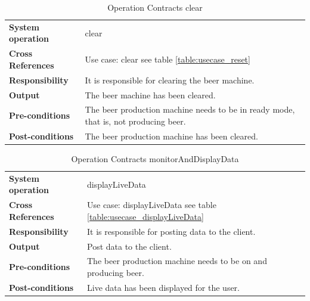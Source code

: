 \begin{table}[H]
    \begin{tabularx}{\textwidth}{|>{\RaggedRight}p{3.7cm}|>{\RaggedRight}X|}
        \hline
        \multicolumn{2}{|c|}{\textbf{clear}}\\
        \hline
        \textbf{System operation} & clear\\
        \hline
        \textbf{Cross References} & Use case: clear see table \ref{table:usecase_reset} \\
        \hline
        \textbf{Responsibility} & It is responsible for clearing the beer 
                machine. \\
        \hline
        \textbf{Output} & The beer machine has been cleared. \\
        \hline
        \textbf{Pre-conditions} & The beer production machine needs to be in
                ready mode, that is, not producing beer. \\
        \hline
        \textbf{Post-conditions} & The beer production machine has been cleared.\\
        \hline
    \end{tabularx}
    \caption{Operation Contracts clear} 
    \label{table:Operation_Contracts_clear}
\end{table}

\begin{table}[H]
    \begin{tabularx}{\textwidth}{|>{\RaggedRight}p{3.7cm}|>{\RaggedRight}X|}
        \hline
        \multicolumn{2}{|c|}{\textbf{display live data}}\\
        \hline
        \textbf{System operation} & displayLiveData\\
        \hline
        \textbf{Cross References} & Use case: displayLiveData see table \ref{table:usecase_displayLiveData} \\
        \hline
        \textbf{Responsibility} & It is responsible for posting data to the client. \\ 
        \hline
        \textbf{Output} & Post data to the client.  \\
        \hline
        \textbf{Pre-conditions} & The beer production machine needs to be on and
                producing beer. \\
        \hline
        \textbf{Post-conditions} & Live data has been displayed for the user. \\
        \hline
    \end{tabularx}
    \caption{Operation Contracts monitorAndDisplayData} 
    \label{table:Operation_Contracts_monitorAndDisplayData}
\end{table}

